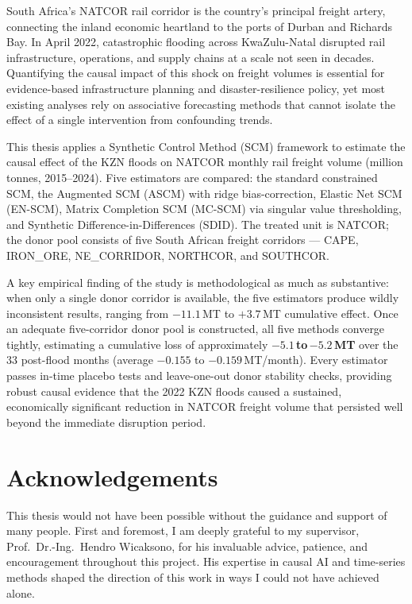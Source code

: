 \documentclass[a4paper,11pt,oneside]{article}
\begin{document}
South Africa's NATCOR rail corridor is the country's principal freight
artery, connecting the inland economic heartland to the ports of
Durban and Richards Bay. In April 2022, catastrophic flooding across
KwaZulu-Natal disrupted rail infrastructure, operations, and supply
chains at a scale not seen in decades. Quantifying the causal impact of
this shock on freight volumes is essential for evidence-based
infrastructure planning and disaster-resilience policy, yet most
existing analyses rely on associative forecasting methods that cannot
isolate the effect of a single intervention from confounding trends.

This thesis applies a Synthetic Control Method (SCM) framework to
estimate the causal effect of the KZN floods on NATCOR monthly rail
freight volume (million tonnes, 2015--2024). Five estimators are
compared: the standard constrained SCM, the Augmented SCM (ASCM) with
ridge bias-correction, Elastic Net SCM (EN-SCM), Matrix Completion SCM
(MC-SCM) via singular value thresholding, and Synthetic
Difference-in-Differences (SDID). The treated unit is NATCOR; the donor
pool consists of five South African freight corridors --- CAPE,
IRON\_ORE, NE\_CORRIDOR, NORTHCOR, and SOUTHCOR.

A key empirical finding of the study is methodological as much as
substantive: when only a single donor corridor is available, the five
estimators produce wildly inconsistent results, ranging from
$-11.1$\,MT to $+3.7$\,MT cumulative effect. Once an adequate
five-corridor donor pool is constructed, all five methods converge
tightly, estimating a cumulative loss of approximately
$\mathbf{-5.1}$\,\textbf{to}\,$\mathbf{-5.2}$\,\textbf{MT} over the
33 post-flood months (average $-0.155$ to $-0.159$\,MT/month). Every
estimator passes in-time placebo tests and leave-one-out donor
stability checks, providing robust causal evidence that the 2022 KZN
floods caused a sustained, economically significant reduction in
NATCOR freight volume that persisted well beyond the immediate
disruption period.

\newpage
\section*{Acknowledgements}

This thesis would not have been possible without the guidance and
support of many people. First and foremost, I am deeply grateful to my
supervisor, Prof.\ Dr.-Ing.\ Hendro Wicaksono, for his invaluable
advice, patience, and encouragement throughout this project. His
expertise in causal AI and time-series methods shaped the direction of
this work in ways I could not have achieved alone.
\end{document}
